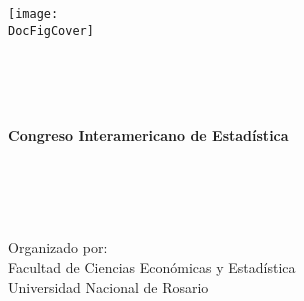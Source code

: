 \thispagestyle{empty}
{\center
{\Large \bf \DocConferenceTitleA} \\[14mm]
{\LARGE \bf \DocConferenceTitleB} \\ [6mm]
{\LARGE \bf \DocYear} \\ [14mm] %
{\large \DocTitle} \\
\begin{center} \setlength{\unitlength}{1cm}
  \texttt{[image: \\DocFigCover]}
\end{center}
\DocDate \\ %
\DocPlace \\[3mm]%
\DocURL \\
}
\newpage


\thispagestyle{empty}




\thispagestyle{empty}
\setcounter{page}{1}
{\center

\vspace*{32 mm}
{\LARGE \bf Congreso Interamericano de Estadística} \\ [6mm]
{\Large \DocTitle}  \\ [16mm]
\vspace{32 mm}
{\large \DocYear} \\[3mm]
{\large \DocPlace} \\[6mm]
{\large \DocURL}\\[10mm]

\vfill

{\Large Organizado por:} \\ [3mm]
{\large Facultad de Ciencias Económicas y Estadística} \\[10mm] %
{\large Universidad Nacional de Rosario} \\[10mm] %



}
\newpage



